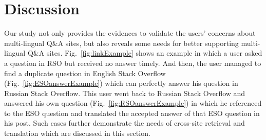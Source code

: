 \section{Discussion}

Our study not only provides the evidences to validate the users' concerns about multi-lingual Q\&A sites, but also reveals some needs for better supporting multi-lingual Q\&A sites.
Fig.~\ref{fig:linkExample} shows an example in which a user asked a question in RSO but received no answer timely.
And then, the user managed to find a duplicate question in English Stack Overflow (Fig.~\ref{fig:ESOanswerExample}) which can perfectly answer his question in Russian Stack Overflow.
This user went back to Russian Stack Overflow and answered his own question (Fig.~\ref{fig:RSOanswerExample}) in which he referenced to the ESO question and translated the accepted answer of that ESO question in his post.
Such cases further demonstrate the needs of cross-site retrieval and translation which are discussed in this section.


